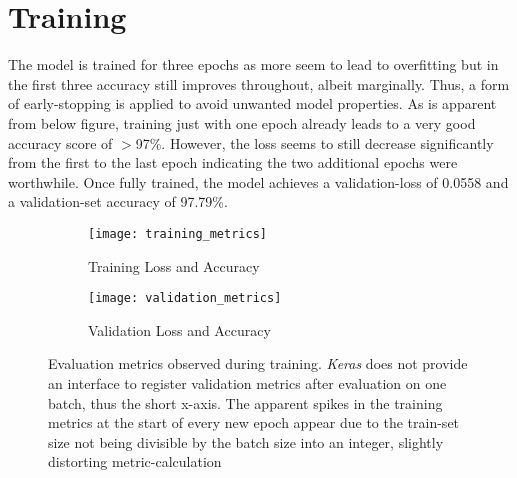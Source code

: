 \documentclass[11pt, oneside]{article}   	%
\begin{document}
\section{Training}
The model is trained for three epochs as more seem to lead to overfitting but in the first three accuracy still improves throughout, albeit marginally. Thus, a form of early-stopping is  applied to avoid unwanted model properties.
As is apparent from below figure, training just with one epoch already leads to a very good accuracy score of $>$97\%. However, the loss seems to still decrease significantly from the first to the last epoch indicating the two additional epochs were worthwhile. Once fully trained, the model achieves a validation-loss of 0.0558 and a validation-set accuracy of 97.79\%.
\newpage
\begin{figure}[h!]
\centering
\begin{subfigure}{.5\textwidth}
	\centering
	\texttt{[image: training\_metrics]}
	\caption{Training Loss and Accuracy}
	\label{A subfigure label}
\end{subfigure}%
\begin{subfigure}{.5\textwidth}
	\centering
	\texttt{[image: validation\_metrics]}
	\caption{Validation Loss and Accuracy}
	\label{A subfigure label}
\end{subfigure}
\caption{Evaluation metrics observed during training. \textit{Keras} does not provide an interface to register validation metrics after evaluation on one batch, thus the short x-axis. The apparent spikes in the training metrics at the start of every new epoch appear due to the train-set size not being divisible by the batch size into an integer, slightly distorting metric-calculation}
\label{figure label}

\end{figure}
\end{document}
